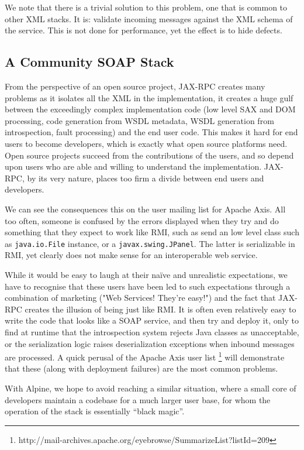 We note that there is a trivial solution to this problem, one that is
common to other XML stacks. It is: validate incoming messages against
the XML schema of the service. This is not done for performance, yet
the effect is to hide defects.

\subsection{A Community SOAP Stack}
\label{alpine:community}
From the perspective of an open source project, JAX-RPC creates
many problems as it isolates all the XML in the implementation, it
creates a huge gulf between the exceedingly complex implementation
code (low level SAX and DOM processing, code generation from WSDL
metadata, WSDL generation from introspection, fault processing) and
the end user code.  This makes it hard for end users to become
developers, which is exactly what open source platforms need. Open
source projects succeed from the contributions of the users, and so
depend upon users who are able and willing to understand the
implementation. JAX-RPC, by its very nature, places too firm a divide
between end users and developers.

We can see the consequences this on the user mailing list for Apache
Axis. All too often, someone is confused by the errors displayed when
they try and do something that they expect to work like RMI, such as
send an low level class such as \verb|java.io.File| instance, or a
\verb|javax.swing.JPanel|. The latter is serializable in RMI, yet
clearly does not make sense for an interoperable web service.

While it would be easy to laugh at their na\"{i}ve and unrealistic
expectations, we have to recognise that these users have been led to
such expectations through a combination of marketing ("Web Services!
They're easy!") and the fact that JAX-RPC creates the illusion of
being just like RMI. It is often even relatively easy to write the
code that looks like a SOAP service, and then try and deploy it, only
to find at runtime that the introspection system rejects Java classes
as unacceptable, or the serialization logic raises deserialization
exceptions when inbound messages are processed. A quick perusal of the
Apache Axis user list
\footnote{http://mail-archives.apache.org/eyebrowse/SummarizeList?listId=209}
will demonstrate that these (along with deployment failures) are the
most common problems.

With Alpine, we hope to avoid reaching a similar situation, where a
small core of developers maintain a codebase for a much larger user
base, for whom the operation of the stack is essentially ``black
magic''. 
